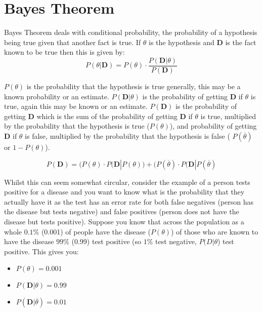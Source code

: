\chapter{Bayes Theorem}

Bayes Theorem deals with conditional probability, the probability of a hypothesis being true given that another fact is true.  If $\theta$ is the hypothesis and $\textbf{D}$ is the fact known to be true then this is given by: 
\begin{equation}
\label{eq:bayes}
P(\theta|\textbf{D}) = P(\theta ) \cdot \frac{P(\textbf{D} |\theta)}{P(\textbf{D})} 
\end{equation}

$P(\theta)$ is the probability that the hypothesis is true generally, this may be a known probability or an estimate.  $P(\textbf{D} |\theta)$ is the probability of getting \textbf{D} if $\theta$ is true, again this may be known or an estimate.  $P(\textbf{D})$ is the probability of getting \textbf{D} which is the sum of the probability of getting \textbf{D} if $\theta$ is true, multiplied by the probability that the hypothesis is true ($P(\theta)$), and probability of getting \textbf{D} if $\theta$ is false, multiplied by the probability that the hypothesis is false ( $P(\overline{\theta})$ or $ 1 - P(\theta)$).

\begin{equation}
    \label{eq:probd}
    P(\textbf{D}) = (P(\theta) \cdot P(\textbf{D}|P(\theta)) + (P(\overline{\theta}) \cdot P(\textbf{D}|P(\overline{\theta})
\end{equation}

Whilst this can seem somewhat circular, consider the example of a person tests positive for a disease and you want to know what is the probability that they actually have it as the test has an error rate for both false negatives (person has the disease but tests negative) and false positives (person does not have the disease but tests positive).  Suppose you know that across the population as a whole $0.1\%$ (0.001) of people have the disease ($P(\theta)$) of those who are known to have the disease $99\%$ (0.99) test positive (so $1\%$ test negative, $P(D|\theta$) test positive. This gives you:
\begin{itemize}
    \item $P(\theta) = 0.001$
    \item $P(\textbf{D}| \theta) = 0.99$
    \item $P(\textbf{D}| \overline{\theta}) = 0.01$
\end{itemize}


